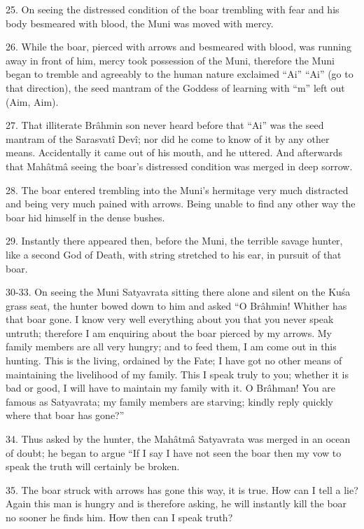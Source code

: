 25. On seeing the distressed condition of the boar trembling with fear and his body besmeared with blood, the Muni was moved with mercy.

26. While the boar, pierced with arrows and besmeared with blood, was running away in front of him, mercy took possession of the Muni, therefore the Muni began to tremble and agreeably to the human nature exclaimed ``Ai'' ``Ai'' (go to that direction), the seed mantram of the Goddess of learning with ``m'' left out (Aim, Aim).

27. That illiterate Br\^ahmin son never heard before that ``Ai'' was the seed mantram of the Sarasvat\^i Dev\^i; nor did he come to know of it by any other means. Accidentally it came out of his mouth, and he uttered. And afterwards that Mah\^atm\^a seeing the boar's distressed condition was merged in deep sorrow.

28. The boar entered trembling into the Muni's hermitage very much distracted and being very much pained with arrows. Being unable to find any other way the boar hid himself in the dense bushes.

29. Instantly there appeared then, before the Muni, the terrible savage hunter, like a second God of Death, with string stretched to his ear, in pursuit of that boar.

30-33. On seeing the Muni Satyavrata sitting there alone and silent on the Ku\'sa grass seat, the hunter bowed down to him and asked ``O Br\^ahmin! Whither has that boar gone. I know very well everything about you that you never speak untruth; therefore I am enquiring about the boar pierced by my arrows. My family members are all very hungry; and to feed them, I am come out in this hunting. This is the living, ordained by the Fate; I have got no other means of maintaining the livelihood of my family. This I speak truly to you; whether it is bad or good, I will have to maintain my family with it. O Br\^ahman! You are famous as Satyavrata; my family members are starving; kindly reply quickly where that boar has gone?''

34. Thus asked by the hunter, the Mah\^atm\^a Satyavrata was merged in an ocean of doubt; he began to argue ``If I say I have not seen the boar then my vow to speak the truth will certainly be broken.

35. The boar struck with arrows has gone this way, it is true. How can I tell a lie? Again this man is hungry and is therefore asking, he will instantly kill the boar no sooner he finds him. How then can I speak truth?

